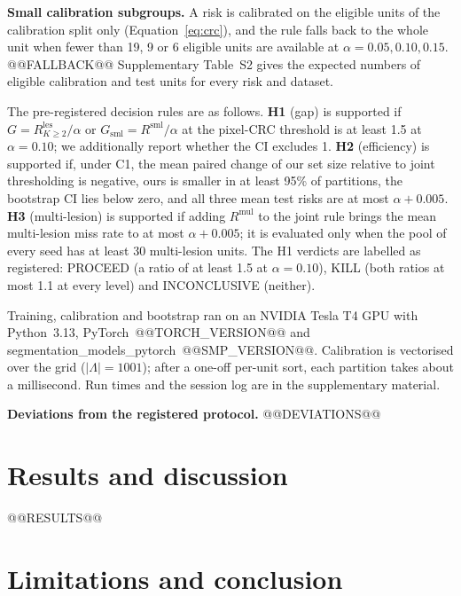 \documentclass[sn-mathphys-num]{sn-jnl}%
\theoremstyle{thmstyleone}
\theoremstyle{thmstyletwo}
\theoremstyle{thmstylethree}
\newcommand{\1}{\mathbb{1}}
\newcommand{\les}{\mathrm{les}}
\newcommand{\sml}{\mathrm{sml}}
\newcommand{\mul}{\mathrm{mul}}
\begin{document}
\textbf{Small calibration subgroups.} A risk is calibrated on the eligible units of the calibration split only (Equation~\eqref{eq:crc}), and the rule falls back to the whole unit when fewer than 19, 9 or 6 eligible units are available at $\alpha=0.05,0.10,0.15$. @@FALLBACK@@ Supplementary Table~S2 gives the expected numbers of eligible calibration and test units for every risk and dataset.

The pre-registered decision rules are as follows. \textbf{H1} (gap) is supported if $G=R^{\les}_{K\ge2}/\alpha$ or $G_{\sml}=R^{\sml}/\alpha$ at the pixel-CRC threshold is at least 1.5 at $\alpha=0.10$; we additionally report whether the CI excludes 1. \textbf{H2} (efficiency) is supported if, under C1, the mean paired change of our set size relative to joint thresholding is negative, ours is smaller in at least 95\% of partitions, the bootstrap CI lies below zero, and all three mean test risks are at most $\alpha+0.005$. \textbf{H3} (multi-lesion) is supported if adding $R^{\mul}$ to the joint rule brings the mean multi-lesion miss rate to at most $\alpha+0.005$; it is evaluated only when the pool of every seed has at least 30 multi-lesion units. The H1 verdicts are labelled as registered: PROCEED (a ratio of at least 1.5 at $\alpha=0.10$), KILL (both ratios at most 1.1 at every level) and INCONCLUSIVE (neither).

Training, calibration and bootstrap ran on an NVIDIA Tesla T4 GPU with Python~3.13, PyTorch~@@TORCH_VERSION@@ and segmentation\_models\_pytorch~@@SMP_VERSION@@. Calibration is vectorised over the grid ($|\Lambda|=1001$); after a one-off per-unit sort, each partition takes about a millisecond. Run times and the session log are in the supplementary material.

\textbf{Deviations from the registered protocol.} @@DEVIATIONS@@

\section{Results and discussion}\label{sec:results}

@@RESULTS@@

\section{Limitations and conclusion}\label{sec:conclusion}
\end{document}
